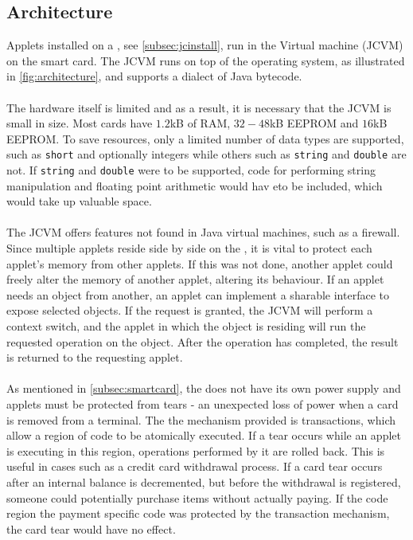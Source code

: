\subsection{\jc Architecture}
Applets installed on a \jc, see \cref{subsec:jcinstall}, run in the \jc Virtual machine (JCVM) on the smart card. The JCVM runs on top of the operating system, as illustrated in \cref{fig:architecture},
and supports a dialect of Java bytecode.\\\\
The hardware itself is limited and as a result, it is necessary that the JCVM is small in size. Most cards have $1.2$kB of RAM, $32-48$kB EEPROM and $16$kB EEPROM. To save resources, only a limited number of data types are supported, such as \texttt{short} and optionally integers while others such as \texttt{string} and \texttt{double} are not. If \texttt{string} and \texttt{double} were to be supported, code for performing string manipulation and floating point arithmetic would hav eto be included, which would take up valuable space.\\\\
The JCVM offers features not found in Java virtual machines, such as a firewall. Since multiple applets reside side by side on the \jc, it is vital to protect each applet's memory from other applets. If this was not done, another applet could freely alter the memory of another applet, altering its behaviour. If an applet needs an object from another, an applet can implement a sharable interface to expose selected objects. If the request is granted, the JCVM will perform a context switch, and the applet in which the object is residing will run the requested operation on the object. After the operation has completed, the result is returned to the requesting applet.\\\\
As mentioned in \cref{subsec:smartcard}, the \jc does not have its own power supply and applets must be protected from tears - an unexpected loss of power when a card is removed from a terminal. The the mechanism provided is transactions, which allow a region of code to be atomically executed. If a tear occurs while an applet is executing in this region, operations performed by it are rolled back. This is useful in cases such as a credit card withdrawal process. If a card tear occurs after an internal balance is decremented, but before the withdrawal is registered, someone could potentially purchase items without actually paying. If the code region the payment specific code was protected by the transaction mechanism, the card tear would have no effect.\\\\
